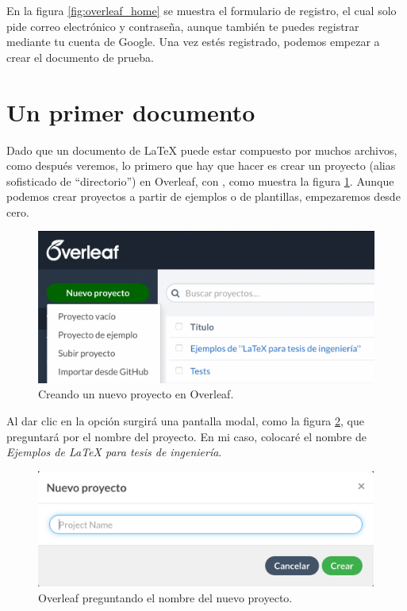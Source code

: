 En la figura \ref{fig:overleaf_home} se muestra el formulario de registro, el cual solo pide correo electrónico y contraseña, aunque también te puedes registrar mediante tu cuenta de Google. Una vez estés registrado, podemos empezar a crear el documento de prueba.



\section{Un primer documento}
\label{sec:un_primer_documento}



Dado que un documento de \LaTeX{} puede estar compuesto por muchos archivos, como después veremos, lo primero que hay que hacer es crear un proyecto (alias sofisticado de ``directorio'') en Overleaf, con , como muestra la figura \ref{fig:overleaf_nuevo_proyecto_300ppi}. Aunque podemos crear proyectos a partir de ejemplos o de plantillas, empezaremos desde cero.

\begin{figure}[ht!]
	\centering
	\includegraphics[scale=1]{img/overleaf_nuevo_proyecto_300ppi.png}
	\caption{Creando un nuevo proyecto en Overleaf.}
	\label{fig:overleaf_nuevo_proyecto_300ppi}
\end{figure}

Al dar clic en la opción  surgirá una pantalla modal, como la figura \ref{fig:overleaf_nombre_proyecto}, que preguntará por el nombre del proyecto. En mi caso, colocaré el nombre de \emph{Ejemplos de \textquotedbl{}LaTeX para tesis de ingeniería\textquotedbl{}}.

\begin{figure}[ht!]
	\centering
	\includegraphics[width=112mm]{img/overleaf_nombre_proyecto_300ppi.png}
	\caption{Overleaf preguntando el nombre del nuevo proyecto.}
	\label{fig:overleaf_nombre_proyecto}
\end{figure}

